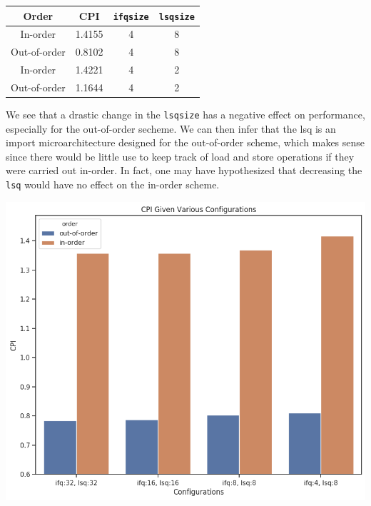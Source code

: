 \documentclass[twocolumn]{article}
\newcommand{\cc}[1]{\texttt{#1}}
\begin{document}
\begingroup
    \centering
    \def\arraystretch{1.5}
        \begin{tabular}{cccc}
            \toprule
            Order & CPI & \cc{ifqsize} & \cc{lsqsize}\\
             \midrule
            In-order & 1.4155 & 4 & 8\\
            Out-of-order & 0.8102 & 4 & 8\\
            \midrule
            In-order & 1.4221 & 4 & 2\\
            Out-of-order & 1.1644 & 4 & 2\\
            \bottomrule
        \end{tabular}
    \label{table:btb}
\endgroup

We see that a drastic change in the \cc{lsqsize} has a negative effect on performance, especially for the out-of-order secheme. We can then infer that the lsq is an import microarchitecture designed for the out-of-order scheme, which makes sense since there would be little use to keep track of load and store operations if they were carried out in-order. In fact, one may have hypothesized that decreasing the \cc{lsq} would have no effect on the in-order scheme. 

\begingroup
    \centering
    \medskip
    \includegraphics[width=0.6\columnwidth]{Lab-Tex/LabX-images/queue.png}
    \label{fig:}
    \medskip
\endgroup
\end{document}
